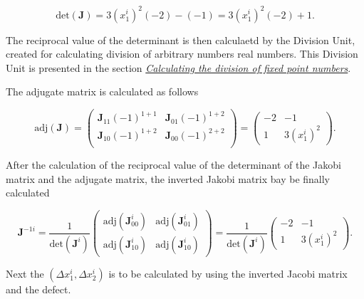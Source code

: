 \documentclass[a4paper, twoside, 11pt]{article}
\begin{document}
    \begin{equation}
        \text{det}(\textbf{J}) = 3 (x_1^i)^2 (-2) - (-1) = 3 (x_1^i)^2 (-2) + 1.
    \end{equation}

    The reciprocal value of the determinant is then calculaetd by the Division Unit, created for calculating division of arbitrary numbers real numbers. This Division Unit is presented in the section \hyperref[sec:calculating-the-division-of-fixed-point-numbers]{\textit{Calculating the division of fixed point numbers}}.\par
The adjugate matrix is calculated as follows

    \begin{equation}
        \text{adj}(\textbf{J}) =
        \begin{pmatrix}
            \textbf{J}_{11} (-1)^{1+1} & \textbf{J}_{01} (-1)^{1+2}\\

            \textbf{J}_{10} (-1)^{1+2} & \textbf{J}_{00} (-1)^{2+2}\\
        \end{pmatrix} =
        \begin{pmatrix}
            -2 & -1\\
            1 & 3 (x_1^i)^2
        \end{pmatrix}.
    \end{equation}
\par
    After the calculation of the reciprocal value of the determinant of the Jakobi matrix and the adjugate matrix, the inverted Jakobi matrix bay be finally calculated

    \begin{equation}
        \textbf{J}^{-1i} =
        \frac{1}{\text{det}(\textbf{J}^i)}
        \begin{pmatrix}
            \text{adj}(\textbf{J}^i_{00}) & \text{adj}(\textbf{J}^i_{01})\\
            \text{adj}(\textbf{J}^i_{10}) & \text{adj}(\textbf{J}^i_{10})
        \end{pmatrix}
        =
        \frac{1}{\text{det}(\textbf{J}^i)}
        \begin{pmatrix}
            -2 & -1\\
            1 & 3 (x_1^i)^2
        \end{pmatrix}.
    \end{equation}
\par
    Next the $(\Delta x_1^i, \Delta x_2^i)$ is to be calculated by using the inverted Jacobi matrix and the defect.
\end{document}
